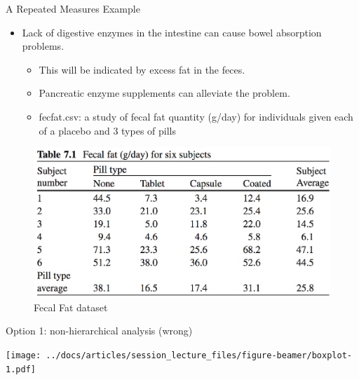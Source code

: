 \documentclass[
  ignorenonframetext,
]{beamer}
\providecommand{\tightlist}{%
  \setlength{\itemsep}{0pt}\setlength{\parskip}{0pt}}
\begin{document}
\begin{frame}{A Repeated Measures Example}
\protect\hypertarget{a-repeated-measures-example}{}

\begin{itemize}
\tightlist
\item
  Lack of digestive enzymes in the intestine can cause bowel absorption
  problems.

  \begin{itemize}
  \tightlist
  \item
    This will be indicated by excess fat in the feces.
  \item
    Pancreatic enzyme supplements can alleviate the problem.
  \item
    fecfat.csv: a study of fecal fat quantity (g/day) for individuals
    given each of a placebo and 3 types of pills
  \end{itemize}
\end{itemize}

\begin{figure}
\centering
\includegraphics{VittinghoffTable71.png}
\caption{Fecal Fat dataset}
\end{figure}

\end{frame}

\begin{frame}{Option 1: non-hierarchical analysis (wrong)}
\protect\hypertarget{option-1-non-hierarchical-analysis-wrong}{}

\texttt{[image: ../docs/articles/session\_lecture\_files/figure-beamer/boxplot-1.pdf]}

\end{frame}
\end{document}
